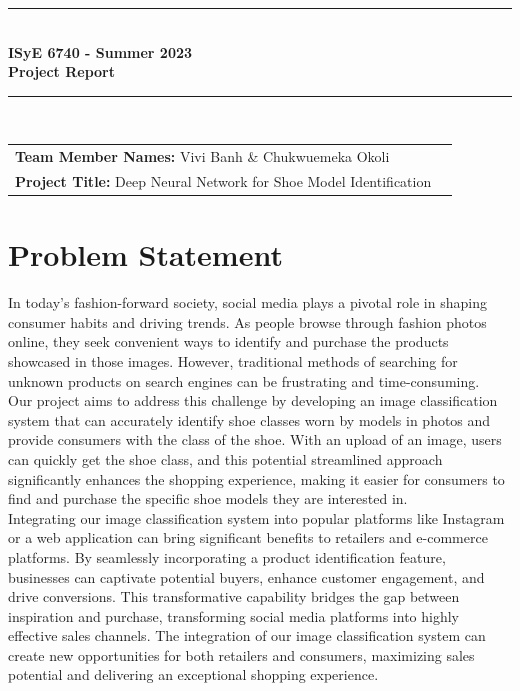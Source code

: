 \documentclass[11pt,a4paper]{article}
\begin{document}

\begin{titlepage}
	\clearpage\thispagestyle{empty}
	\centering
	\vspace{1cm}
		
	\rule{\linewidth}{1mm} \\[0.5cm]
	{ \Large \bfseries ISyE 6740 - Summer 2023\\[0.2cm]
		Project Report}\\[0.5cm]
	\rule{\linewidth}{1mm} \\[1cm]

		\begin{tabular}{l p{5cm}}
		\textbf{Team Member Names:} Vivi Banh \& Chukwuemeka Okoli \\[10pt]
		\textbf{Project Title:} Deep Neural Network for Shoe Model Identification  \\[10pt]
		\end{tabular} 

\end{titlepage}	
	

\section{Problem Statement}\label{sec1}
In today's fashion-forward society, social media plays a pivotal role in shaping consumer habits and driving trends. As people browse through fashion photos online, they seek convenient ways to identify and purchase the products showcased in those images. However, traditional methods of searching for unknown products on search engines can be frustrating and time-consuming.  \\

\noindent
Our project aims to address this challenge by developing an image classification system that can accurately identify shoe classes worn by models in photos and provide consumers with the class of the shoe. With an upload of an image, users can quickly get the shoe class, and this potential streamlined approach significantly enhances the shopping experience, making it easier for consumers to find and purchase the specific shoe models they are interested in. \\

\noindent
Integrating our image classification system into popular platforms like Instagram or a web application can bring significant benefits to retailers and e-commerce platforms. By seamlessly incorporating a product identification feature, businesses can captivate potential buyers, enhance customer engagement, and drive conversions. This transformative capability bridges the gap between inspiration and purchase, transforming social media platforms into highly effective sales channels. The integration of our image classification system can create new opportunities for both retailers and consumers, maximizing sales potential and delivering an exceptional shopping experience. 
\end{document}
